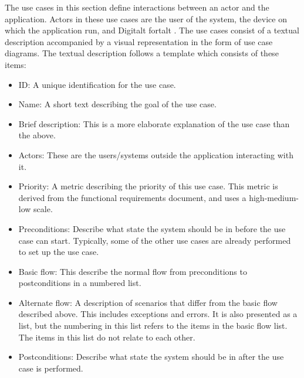 The use cases in this section define interactions between an actor and the application. Actors in these use cases are the user of the system, the device on which the application run, and Digitalt fortalt . The use cases consist of a textual description accompanied by a visual representation in the form of use case diagrams. The textual description follows a template which consists of these items:
\begin{itemize}
\item ID: A unique identification for the use case.
\item Name: A short text describing the goal of the use case.
\item Brief description: This is a more elaborate explanation of the use case than the above.
\item Actors: These are the users/systems outside the application interacting with it.
\item Priority: A metric describing the priority of this use case. This metric is derived from the functional requirements document, and uses a high-medium-low scale.
\item Preconditions: Describe what state the system should be in before the use case can start. Typically, some of the other use cases are already performed to set up the use case.
\item Basic flow: This describe the normal flow from preconditions to postconditions in a numbered list.
\item Alternate flow: A description of scenarios that differ from the basic flow described above. This includes exceptions and errors. It is also presented as a list, but the numbering in this list refers to the items in the basic flow list. The items in this list do not relate to each other.
\item Postconditions: Describe what state the system should be in after the use case is performed.
\end{itemize}

